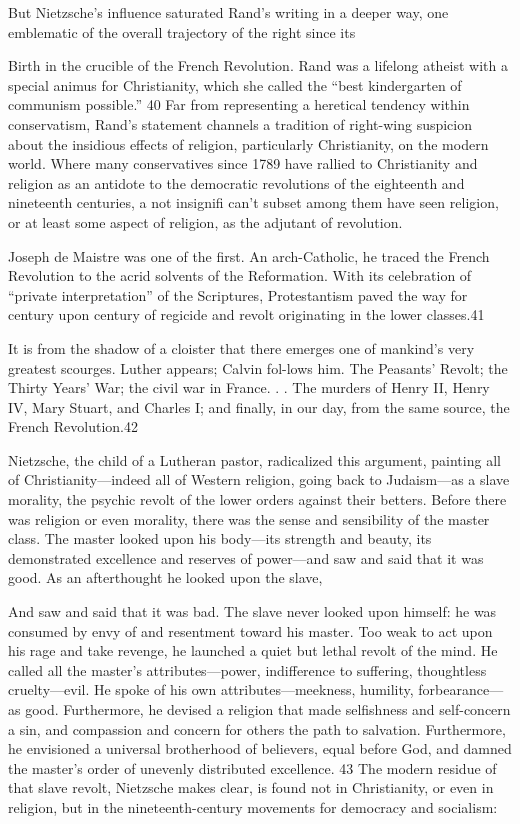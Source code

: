  \par 
But Nietzsche’s influence saturated Rand’s writing in a deeper way, one emblematic of the overall trajectory of the right since its
 \par 
Birth in the crucible of the French Revolution. Rand was a lifelong atheist with a special animus for Christianity, which she called the “best kindergarten of communism possible.” {\color{blue}40} Far from representing a heretical tendency within conservatism, Rand’s statement channels a tradition of right-wing suspicion about the insidious effects of religion, particularly Christianity, on the modern world. Where many conservatives since 1789 have rallied to Christianity and religion as an antidote to the democratic revolutions of the eighteenth and nineteenth centuries, a not insignifi can't subset among them have seen religion, or at least some aspect of religion, as the adjutant of revolution.
 \par 
Joseph de Maistre was one of the first. An arch-Catholic, he traced the French Revolution to the acrid solvents of the Reformation. With its celebration of “private interpretation” of the Scriptures, Protestantism paved the way for century upon century of regicide and revolt originating in the lower classes.{\color{blue}41}
 \par 
It is from the shadow of a cloister that there emerges one of mankind’s very greatest scourges. Luther appears; Calvin fol-lows him. The Peasants’ Revolt; the Thirty Years’ War; the civil war in France. . . The murders of Henry II, Henry IV, Mary Stuart, and Charles I; and finally, in our day, from the same source, the French Revolution.{\color{blue}42}
 \par 
Nietzsche, the child of a Lutheran pastor, radicalized this argument, painting all of Christianity—indeed all of Western religion, going back to Judaism—as a slave morality, the psychic revolt of the lower orders against their betters. Before there was religion or even morality, there was the sense and sensibility of the master class. The master looked upon his body—its strength and beauty, its demonstrated excellence and reserves of power—and saw and said that it was good. As an afterthought he looked upon the slave,
 \par 
And saw and said that it was bad. The slave never looked upon himself: he was consumed by envy of and resentment toward his master. Too weak to act upon his rage and take revenge, he launched a quiet but lethal revolt of the mind. He called all the master’s attributes—power, indifference to suffering, thoughtless cruelty—evil. He spoke of his own attributes—meekness, humility, forbearance—as good. Furthermore, he devised a religion that made selfishness and self-concern a sin, and compassion and concern for others the path to salvation. Furthermore, he envisioned a universal brotherhood of believers, equal before God, and damned the master’s order of unevenly distributed excellence. {\color{blue}43} The modern residue of that slave revolt, Nietzsche makes clear, is found not in Christianity, or even in religion, but in the nineteenth-century movements for democracy and socialism:
